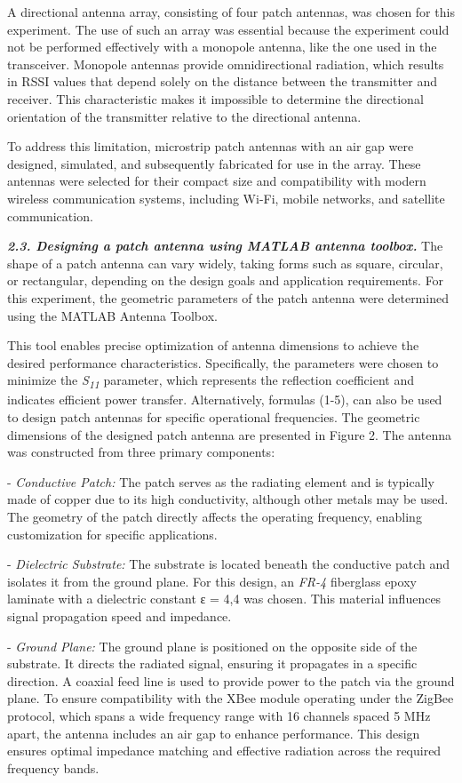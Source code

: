 \begin{multicols}{2}
A directional antenna array, consisting of four patch antennas, was
chosen for this experiment. The use of such an array was essential
because the experiment could not be performed effectively with a
monopole antenna, like the one used in the transceiver. Monopole
antennas provide omnidirectional radiation, which results in RSSI values
that depend solely on the distance between the transmitter and receiver.
This characteristic makes it impossible to determine the directional
orientation of the transmitter relative to the directional antenna.

To address this limitation, microstrip patch antennas with an air gap
were designed, simulated, and subsequently fabricated for use in the
array. These antennas were selected for their compact size and
compatibility with modern wireless communication systems, including
Wi-Fi, mobile networks, and satellite communication.

\emph{{\bfseries 2.3. Designing a patch antenna using MATLAB antenna
toolbox.}} The shape of a patch antenna can vary widely, taking forms
such as square, circular, or rectangular, depending on the design goals
and application requirements. For this experiment, the geometric
parameters of the patch antenna were determined using the MATLAB Antenna
Toolbox.

This tool enables precise optimization of antenna dimensions to achieve
the desired performance characteristics. Specifically, the parameters
were chosen to minimize the \emph{S\textsubscript{11 \hspace{0pt}}}
parameter, which represents the reflection coefficient and indicates
efficient power transfer. Alternatively, formulas (1-5), can also be
used to design patch antennas for specific operational frequencies. The
geometric dimensions of the designed patch antenna are presented in
Figure 2. The antenna was constructed from three primary components:

- \emph{Conductive Patch:} The patch serves as the radiating element and
is typically made of copper due to its high conductivity, although
other metals may be used. The geometry of the patch directly affects
the operating frequency, enabling customization for specific
applications.

- \emph{Dielectric Substrate:} The substrate is located beneath the
conductive patch and isolates it from the ground plane. For this
design, an \emph{FR-4} fiberglass epoxy laminate with a dielectric
constant ε = 4,4 was chosen. This material influences signal
propagation speed and impedance.

- \emph{Ground Plane:} The ground plane is positioned on the opposite
side of the substrate. It directs the radiated signal, ensuring it
propagates in a specific direction. A coaxial feed line is used to
provide power to the patch via the ground plane.
To ensure compatibility with the XBee module operating under the ZigBee
protocol, which spans a wide frequency range with 16 channels spaced 5
MHz apart, the antenna includes an air gap to enhance performance. This
design ensures optimal impedance matching and effective radiation across
the required frequency bands.
\end{multicols}

